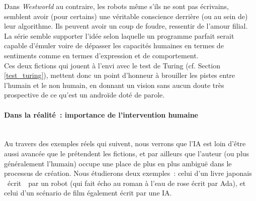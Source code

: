 \documentclass{article}
\newcommand{\subsubsubsection}[1]{\paragraph{#1}\mbox{}\\}
\begin{document}
					Dans \textit{Westworld} au contraire, les robots même s'ils ne sont pas écrivains, semblent avoir (pour certains) une véritable conscience derrière (ou au sein de) leur algorithme. Ils peuvent avoir un coup de foudre, ressentir de l'amour filial. La série semble supporter l'idée selon laquelle un programme parfait serait capable d'émuler voire de dépasser les capacités humaines en termes de sentiments comme en termes d'expression et de comportement.\\
					
					Ces deux fictions qui jouent à l'envi avec le test de Turing (cf. Section \ref{test_turing}), mettent donc un point d'honneur à brouiller les pistes entre l'humain et le non humain, en donnant un vision sans aucun doute très prospective de ce qu'est un androïde doté de parole.
					
					
					
				\subsubsubsection{Dans la réalité~: importance de l'intervention humaine}
					Au travers des exemples réels qui suivent, nous verrons que l'IA est loin d'être aussi avancée que le prétendent les fictions, et par ailleurs que l'auteur (ou plus généralement l'humain) occupe une place de plus en plus ambiguë dans le processus de création. Nous étudierons deux exemples~: celui d'un livre japonais \guillemotleft~écrit~\guillemotright~par un robot (qui fait écho au roman à l'eau de rose écrit par Ada), et celui d'un scénario de film également écrit par une IA.\\
					
\end{document}
